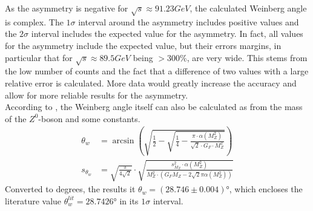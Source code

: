As the asymmetry is negative for $\sqrt{s}\approx\unit{91.23}{GeV}$, the calculated Weinberg angle is complex. The $1\sigma$ interval around the asymmetry includes positive values and the $2\sigma$ interval includes the expected value for the asymmetry. In fact, all values for the asymmetry include the expected value, but their errors margins, in particular that for $\sqrt{s}\approx\unit{89.5}{GeV}$ being  $>300\%$, are very wide. This stems from the low number of counts and the fact that a difference of two values with a large relative error is calculated. More data would greatly increase the accuracy and allow for more reliable results for the asymmetry.\\
According to \cite{muenchen}, the Weinberg angle itself can also be calculated as from the mass of the $Z^0$-boson and some constants. 
\begin{equation}
\begin{aligned}
\theta_w&=\arcsin\left(\sqrt{\frac{1}{2}-\sqrt{\frac{1}{4}-\frac{\pi\cdot\alpha(M_Z^2)}{\sqrt{2}\cdot G_F\cdot M_Z^2}}}\right)\\
s_{\theta_w}&=\sqrt{\frac{\pi}{4\sqrt{2}}}\cdot\sqrt{\frac{s_{M_Z}^2\cdot\alpha(M_Z^2)}{M_Z^2\cdot(G_FM_Z-2\sqrt{2}\pi\alpha(M_Z^2))}}
\end{aligned}
\end{equation}
Converted to degrees, the results it $\theta_w=(28.746\pm0.004)$°, which encloses the literature value $\theta_w^{lit}=28.7426$° \cite{muenchen} in its $1\sigma$ interval.

